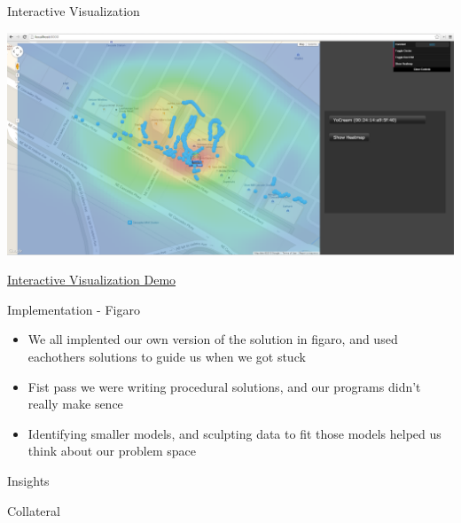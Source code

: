 \documentclass[11pt]{beamer}
\begin{document}
\begin{frame}{Interactive Visualization}

\includegraphics[height=0.55\textheight]{pictures/screenshot4.png}

\href{http://localhost:8000/}{Interactive Visualization Demo}

\end{frame}

\begin{frame}{Implementation - Figaro}
\begin{multicols}{2}
\resizebox{!}{1.5in}{
}
\columnbreak

\begin{itemize}
\item We all implented our own version of the solution in figaro, and used eachothers solutions to guide us when we got stuck
\item Fist pass we were writing procedural solutions, and our programs didn't really make sence
\item Identifying smaller models, and sculpting data to fit those models helped us think about our problem space
\end{itemize}
\end{multicols}

\end{frame}

\begin{frame}{Insights}

\end{frame}

\begin{frame}{Collateral}

\end{frame}
\end{document}
